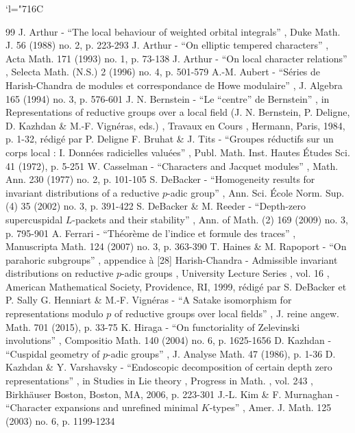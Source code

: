\documentclass[11pt]{article}
\numberwithin{equation}{section}\providecommand{\og}{«\,}\providecommand{\fg}{\,»}
\newcommand{\Changelback}{\mathcode`l="716C}
\theoremstyle{plain}
\theoremstyle{definition}
\begin{document}
\Changelback


\begin{thebibliography}{99}
 J. Arthur - “The local behaviour of weighted orbital integrals” , Duke Math. J. 56 (1988) no. 2, p. 223-293
 J. Arthur - “On elliptic tempered characters” , Acta Math. 171 (1993) no. 1, p. 73-138
 J. Arthur - “On local character relations” , Selecta Math. (N.S.) 2 (1996) no. 4, p. 501-579
 A.-M. Aubert - “Séries de Harish-Chandra de modules et correspondance de Howe modulaire” , J. Algebra 165 (1994) no. 3, p. 576-601
 J. N. Bernstein - “Le “centre” de Bernstein” , in Representations of reductive groups over a local field (J. N. Bernstein, P. Deligne, D. Kazhdan \& M.-F. Vignéras, eds.) , Travaux en Cours , Hermann, Paris, 1984, p. 1-32, rédigé par P. Deligne
 F. Bruhat \& J. Tits - “Groupes réductifs sur un corps local : I. Données radicielles valuées” , Publ. Math. Inst. Hautes Études Sci. 41 (1972), p. 5-251
 W. Casselman - “Characters and Jacquet modules” , Math. Ann. 230 (1977) no. 2, p. 101-105
 S. DeBacker - “Homogeneity results for invariant distributions of a reductive $p$-adic group” , Ann. Sci. École Norm. Sup. (4) 35 (2002) no. 3, p. 391-422
 S. DeBacker \& M. Reeder - “Depth-zero supercuspidal $L$-packets and their stability” , Ann. of Math. (2) 169 (2009) no. 3, p. 795-901
 A. Ferrari - “Théorème de l’indice et formule des traces” , Manuscripta Math. 124 (2007) no. 3, p. 363-390
 T. Haines \& M. Rapoport - “On parahoric subgroups” , appendice à [28]
 Harish-Chandra - Admissible invariant distributions on reductive $p$-adic groups , University Lecture Series , vol. 16 , American Mathematical Society, Providence, RI, 1999, rédigé par S. DeBacker et P. Sally
 G. Henniart \& M.-F. Vignéras - “A Satake isomorphism for representations modulo $p$ of reductive groups over local fields” , J. reine angew. Math. 701 (2015), p. 33-75
 K. Hiraga - “On functoriality of Zelevinski involutions” , Compositio Math. 140 (2004) no. 6, p. 1625-1656
 D. Kazhdan - “Cuspidal geometry of $p$-adic groups” , J. Analyse Math. 47 (1986), p. 1-36
 D. Kazhdan \& Y. Varshavsky - “Endoscopic decomposition of certain depth zero representations” , in Studies in Lie theory , Progress in Math. , vol. 243 , Birkhäuser Boston, Boston, MA, 2006, p. 223-301
 J.-L. Kim \& F. Murnaghan - “Character expansions and unrefined minimal $K$-types” , Amer. J. Math. 125 (2003) no. 6, p. 1199-1234

\end{thebibliography}
\end{document}
